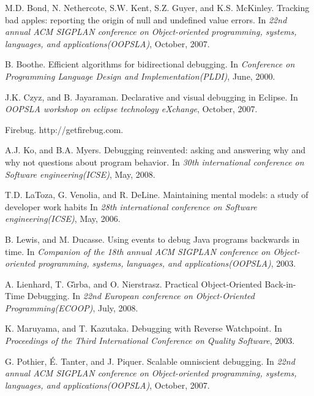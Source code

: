 \documentclass[preprint]{sigplanconf}
\begin{document}
\begin{thebibliography}{10}
\softraggedright

M.D. Bond, N. Nethercote, S.W. Kent, S.Z. Guyer, and K.S. McKinley. \newblock Tracking bad apples: reporting the origin of null and undefined value errors.
\newblock In \emph{22nd annual ACM SIGPLAN conference on Object-oriented programming, systems, languages, and applications(OOPSLA)},
October, 2007.

B. Boothe. \newblock Efficient algorithms for bidirectional debugging.
\newblock In \emph{Conference on Programming Language Design and Implementation(PLDI)},
June, 2000.

J.K. Czyz, and B. Jayaraman. \newblock Declarative and visual debugging in Eclipse.
\newblock In \emph{OOPSLA workshop on eclipse technology eXchange},
October, 2007.

Firebug. \newblock http://getfirebug.com.

A.J. Ko, and B.A. Myers. \newblock Debugging reinvented: asking and answering why and why not questions about program behavior.
\newblock In \emph{30th international conference on Software engineering(ICSE)},
May, 2008.

T.D. LaToza, G. Venolia, and R. DeLine. \newblock Maintaining mental models: a study of developer work habits
\newblock In \emph{28th international conference on Software engineering(ICSE)},
May, 2006.

B. Lewis, and M. Ducasse. \newblock Using events to debug Java programs backwards in time.
\newblock In \emph{Companion of the 18th annual ACM SIGPLAN conference on Object-oriented programming, systems, languages, and applications(OOPSLA)},
2003.

A. Lienhard, T. G\^{\i}rba, and O. Nierstrasz. \newblock Practical Object-Oriented Back-in-Time Debugging.
\newblock In \emph{22nd European conference on Object-Oriented Programming(ECOOP)},
July, 2008.

K. Maruyama, and T. Kazutaka. \newblock Debugging with Reverse Watchpoint.
\newblock In \emph{Proceedings of the Third International Conference on Quality Software},
2003.

G. Pothier, \'{E}. Tanter, and J. Piquer. \newblock Scalable omniscient debugging.
\newblock In \emph{22nd annual ACM SIGPLAN conference on Object-oriented programming, systems, languages, and applications(OOPSLA)},
October, 2007.


\end{thebibliography}
\end{document}
